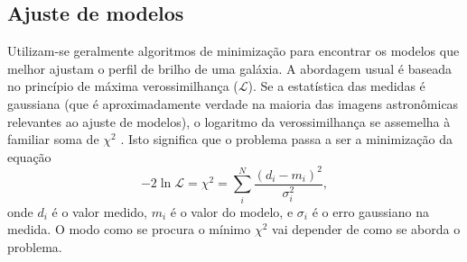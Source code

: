 

\subsection{Ajuste de modelos}
\label{sec:morph:comp:ajuste}

Utilizam-se geralmente algoritmos de minimização para encontrar os modelos que
melhor ajustam o perfil de brilho de uma galáxia. A abordagem usual é baseada no
princípio de máxima verossimilhança ($\mathcal{L}$). Se a estatística das
medidas é gaussiana (que é aproximadamente verdade na maioria das imagens
astronômicas relevantes ao ajuste de modelos), o logaritmo da verossimilhança se
assemelha à familiar soma de $\chi^2$ \citep[seção 4.1.2]{Erwin2015}. Isto
significa que o problema passa a ser a minimização da equação
\begin{equation*}
-2\ln\mathcal{L} = \chi^2 = \sum_i^N \frac{\left(d_i -
m_i\right)^2}{\sigma_i^2},
\end{equation*}
onde $d_i$ é o valor medido, $m_i$ é o valor do modelo, e $\sigma_i$ é o erro
gaussiano na medida. O modo como se procura o mínimo $\chi^2$ vai depender de
como se aborda o problema.

